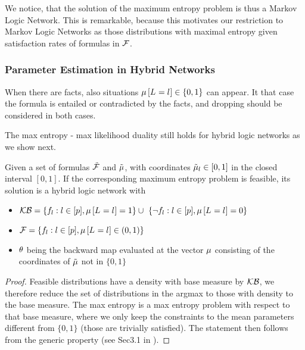 We notice, that the solution of the maximum entropy problem is thus a Markov Logic Network.
This is remarkable, because this motivates our restriction to Markov Logic Networks as those distributions with maximal entropy given satisfaction rates of formulas in $\mathcal{F}$.



\subsubsection{Parameter Estimation in Hybrid Networks}

When there are facts, also situations $\mu\left[L_{}=l_{}\right]\in\{0,1\}$ can appear.
It that case the formula is entailed or contradicted by the facts, and dropping should be considered in both cases.

The max entropy - max likelihood duality still holds for hybrid logic networks as we show next.

\begin{theorem}
	Given a set of formulas $\tilde{\mathcal{F}}$ and $\tilde{\mu}$, with coordinates $\tilde{\mu}_l\in[0,1]$ in the closed interval $[0,1]$.
	If the corresponding maximum entropy problem is feasible, its solution is a hybrid logic network with 
	\begin{itemize}
		\item $\hardformulaset= \{\enumformula : \selindexin, \meanparamat{\indexedselvariable} = 1\} \cup  \{\lnot\enumformula : \selindexin, \meanparamat{\indexedselvariable} = 0\} $
		\item $\mathcal{F} = \{f_{l} : l\in[p], \mu\left[L_{}=l_{}\right] \in (0,1)\}$
		\item $\theta$ being the backward map evaluated at the vector $\mu$ consisting of the coordinates of $\tilde{\mu}$ not in $\{0,1\}$
	\end{itemize}
\end{theorem}
\begin{proof}
	Feasible distributions have a density with base measure by $\mathcal{KB}$, we therefore reduce the set of distributions in the argmax to those with density to the base measure.
	The max entropy is a max entropy problem with respect to that base measure, where we only keep the constraints to the mean parameters different from $\{0,1\}$ (those are trivially satisfied).
	The statement then follows from the generic property (see Sec3.1 in \cite{wainwright_graphical_2008}).
\end{proof}






